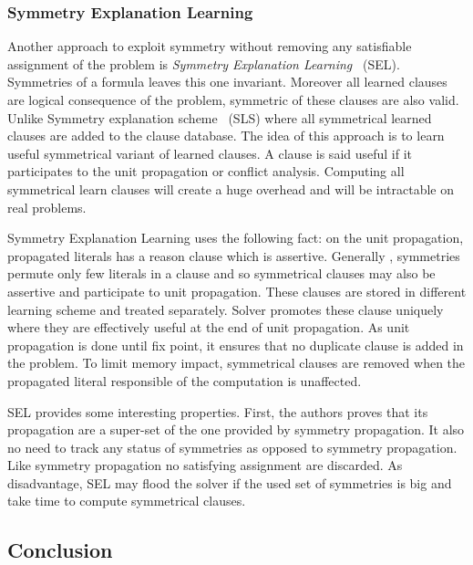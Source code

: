 \subsubsection{Symmetry Explanation Learning}


Another approach to exploit symmetry without removing any satisfiable assignment of the problem
is \emph{Symmetry Explanation Learning}~\cite{devriendt2017symmetric} (SEL). 
Symmetries of a formula leaves this one invariant. Moreover all learned clauses are logical consequence of the problem, symmetric of these clauses are also valid.
Unlike Symmetry explanation scheme~\cite{benhamou2010enhancing} (SLS) where all symmetrical learned clauses
are added to the clause database.
The idea of this approach is to learn useful symmetrical variant of learned clauses.
 A clause is said useful if it participates to the unit propagation or conflict analysis.
Computing all symmetrical learn clauses will create a huge overhead and will be intractable 
on real problems.

Symmetry Explanation Learning uses the following fact:
on the unit propagation, propagated literals has a reason clause which is assertive.
Generally , symmetries permute only few literals in a clause and so symmetrical clauses may
also be assertive and participate to unit propagation.
 These clauses are stored in different learning scheme and 
treated separately. Solver promotes these clause  uniquely where they are effectively useful
at the end of unit propagation. As unit propagation is done until fix point, it
ensures that no duplicate clause is added in the problem.
To limit memory impact, symmetrical clauses are removed when the propagated literal 
responsible of the computation is unaffected.

SEL provides some interesting properties. First, the authors proves that its propagation are a super-set of the one provided by symmetry propagation. It also no need to track any status of 
symmetries as opposed to symmetry propagation. Like symmetry propagation no satisfying assignment are discarded.
As disadvantage, SEL may flood the solver if the used set of symmetries is big and take time 
to compute symmetrical clauses. 


\subsection{Conclusion}




